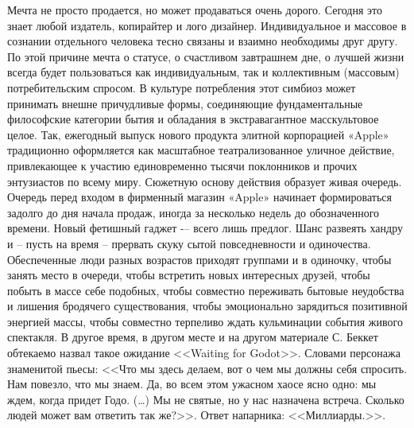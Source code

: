 Мечта не просто продается, но может продаваться очень дорого. Сегодня это знает любой издатель, копирайтер и лого дизайнер. Индивидуальное и массовое в сознании отдельного человека тесно связаны и взаимно необходимы друг другу. По этой причине мечта о статусе, о счастливом завтрашнем дне, о лучшей жизни всегда будет пользоваться как индивидуальным, так и коллективным (массовым) потребительским спросом.  В культуре потребления этот симбиоз может принимать внешне причудливые формы, соединяющие фундаментальные философские категории бытия и обладания в экстравагантное масскультовое  целое. Так, ежегодный выпуск нового продукта элитной корпорацией  «Apple» традиционно оформляется как масштабное театрализованное уличное действие, привлекающее к участию единовременно  тысячи поклонников и прочих энтузиастов по всему миру. Сюжетную основу  действия образует живая очередь. Очередь перед  входом в фирменный магазин «Apple» начинает формироваться задолго до дня начала продаж, иногда за несколько недель до обозначенного времени. Новый фетишный гаджет -– всего лишь предлог. Шанс развеять хандру и -- пусть на время -- прервать скуку сытой повседневности и одиночества.   Обеспеченные люди разных возрастов приходят группами и в одиночку, чтобы занять место в очереди, чтобы встретить новых интересных друзей, чтобы побыть в массе себе подобных, чтобы совместно переживать бытовые неудобства и лишения бродячего существования, чтобы эмоционально зарядиться позитивной энергией массы, чтобы совместно терпеливо ждать кульминации события живого спектакля.  В другое время, в другом месте и на другом материале С. Беккет обтекаемо назвал такое ожидание <<Waiting for Godot>>.  Словами персонажа знаменитой пьесы: <<Что мы здесь делаем, вот о чем мы должны себя спросить. Нам повезло, что мы знаем. Да, во всем этом ужасном хаосе ясно одно: мы ждем, когда придет Годо. (\ldots) Мы не святые, но у нас назначена встреча. Сколько людей может вам ответить так же?>>.  Ответ напарника: <<Миллиарды.>>\autocite{bekket2009}.

